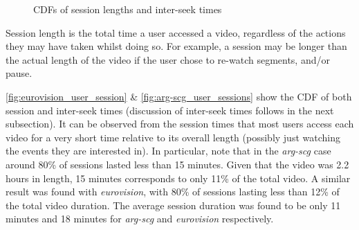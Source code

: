 \begin{figure}[t]
    \centering


    \caption{CDFs of session lengths and inter-seek times}
    \label{fig:view_user_sessions}
\end{figure}

Session length is the total time a user accessed a video, regardless of the actions they may have taken whilst doing so. For example, a session may be longer than the actual length of the video if the user chose to re-watch segments, and/or pause.

\autoref{fig:eurovision_user_session} \& \autoref{fig:arg-scg_user_sessions} show the CDF of both session and inter-seek times (discussion of inter-seek times follows in the next subsection). It can be observed from the session times that most users access each video for a very short time relative to its overall length (possibly just watching the events they are interested in). In particular, note that in the \emph{arg-scg} case around 80\% of sessions lasted less than 15 minutes. Given that the video was 2.2 hours in length, 15 minutes corresponds to only 11\% of the total video. A similar result was found with \emph{eurovision}, with 80\% of sessions lasting less than 12\% of the total video duration. The average session duration was found to be only 11 minutes and 18 minutes for \emph{arg-scg} and \emph{eurovision} respectively.

